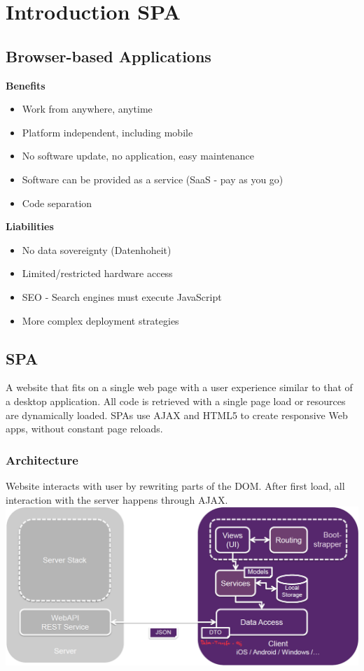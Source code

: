 
\section{Introduction SPA}
\subsection{Browser-based Applications}
\textbf{Benefits}
\begin{itemize}
    \item Work from anywhere, anytime
    \item Platform independent, including mobile
    \item No software update, no application, easy maintenance
    \item Software can be provided as a service (SaaS - pay as you go)
    \item Code separation
\end{itemize}
\textbf{Liabilities}
\begin{itemize}
    \item No data sovereignty (Datenhoheit)
    \item Limited/restricted hardware access
    \item SEO - Search engines must execute JavaScript
    \item More complex deployment strategies
\end{itemize}

\subsection{SPA}
A website that fits on a single web page with a user experience similar to that of a desktop application.
All code is retrieved with a single page load or resources are dynamically loaded.
SPAs use AJAX and HTML5 to create responsive Web apps, without constant page reloads.

\subsubsection{Architecture}
Website interacts with user by rewriting parts of the DOM.
After first load, all interaction with the server happens through AJAX.
\includegraphics[width=\linewidth]{img/spa_architecture.png}

